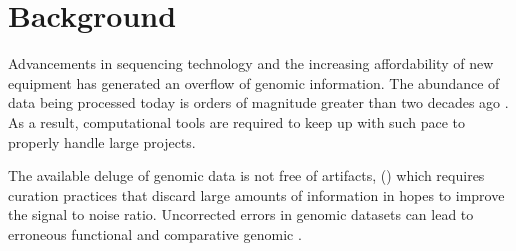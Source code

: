 \section{Background}


Advancements in sequencing technology and the increasing affordability of new
equipment has generated an overflow of genomic information.
The abundance of data being processed today is orders of magnitude greater than
two decades ago .
As a result, computational tools are required to keep up with such pace to
properly handle large projects.

The available deluge of genomic data is not free of artifacts,
()
which requires curation practices that discard large amounts of information in
hopes to improve the signal to noise ratio.
Uncorrected errors in genomic datasets can lead to erroneous functional and
comparative genomic  .




